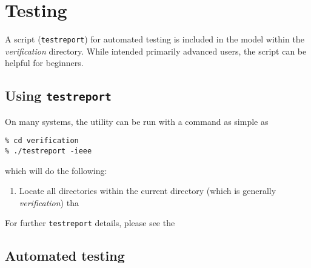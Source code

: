 
\section{Testing}
\label{sect:testing}
\label{www:testing}

A script (\texttt{testreport}) for automated testing is included in
the model within the {\em verification} directory.  While intended
primarily advanced users, the script can be helpful for beginners.

\subsection{Using \texttt{testreport}}

On many systems, the utility can be run with a command as simple as
\begin{verbatim}
% cd verification
% ./testreport -ieee
\end{verbatim}
which will do the following:
\begin{enumerate}
\item Locate all directories within the current directory (which is
  generally {\em verification}) tha
\end{enumerate}

For further \texttt{testreport} details, please see the 


\subsection{Automated testing}

